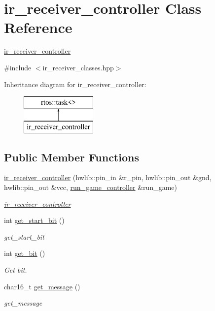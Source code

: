 \hypertarget{classir__receiver__controller}{}\section{ir\+\_\+receiver\+\_\+controller Class Reference}
\label{classir__receiver__controller}


\hyperlink{classir__receiver__controller}{ir\+\_\+receiver\+\_\+controller}  




{\ttfamily \#include $<$ir\+\_\+receiver\+\_\+classes.\+hpp$>$}

Inheritance diagram for ir\+\_\+receiver\+\_\+controller\+:\begin{figure}[H]
\begin{center}
\leavevmode
\includegraphics[height=2.000000cm]{classir__receiver__controller}
\end{center}
\end{figure}
\subsection*{Public Member Functions}
\begin{DoxyCompactItemize}
\item 
\hyperlink{classir__receiver__controller_a8ef3a05bd1d4c8531e11d57af8519146}{ir\+\_\+receiver\+\_\+controller} (hwlib\+::pin\+\_\+in \&r\+\_\+pin, hwlib\+::pin\+\_\+out \&gnd, hwlib\+::pin\+\_\+out \&vcc, \hyperlink{classrun__game__controller}{run\+\_\+game\+\_\+controller} \&run\+\_\+game)
\begin{DoxyCompactList}\small\item\em \hyperlink{classir__receiver__controller}{ir\+\_\+receiver\+\_\+controller} \end{DoxyCompactList}\item 
int \hyperlink{classir__receiver__controller_ad98b3cc0cb528a0b40e52d900638f3ec}{get\+\_\+start\+\_\+bit} ()
\begin{DoxyCompactList}\small\item\em get\+\_\+start\+\_\+bit \end{DoxyCompactList}\item 
int \hyperlink{classir__receiver__controller_a6cc44257482f6e2f463714f7b9c3784a}{get\+\_\+bit} ()
\begin{DoxyCompactList}\small\item\em Get bit. \end{DoxyCompactList}\item 
char16\+\_\+t \hyperlink{classir__receiver__controller_aaef8491c3e15d003898a4f2bfb2069d6}{get\+\_\+message} ()
\begin{DoxyCompactList}\small\item\em get\+\_\+message \end{DoxyCompactList}\end{DoxyCompactItemize}


